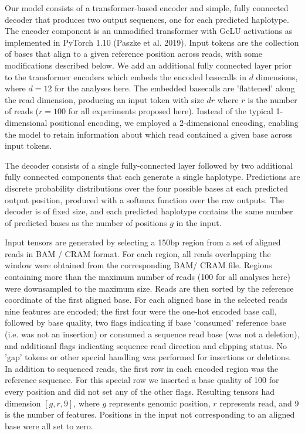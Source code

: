 \documentclass[]{article}
\begin{document}
Our model consists of a transformer-based encoder and simple, fully connected decoder that produces two output sequences, one for each predicted haplotype. The encoder component is an unmodified transformer with GeLU activations as implemented in PyTorch 1.10 (Paszke et al. 2019). Input tokens are the collection of bases that align to a given reference position across reads, with some modifications described below. We add an additional fully connected layer prior to the transformer encoders which embeds the encoded basecalls in $d$ dimensions, where $d=12$ for the analyses here. The embedded basecalls are 'flattened' along the read dimension, producing an input token with size $dr$ where $r$ is the number of reads ($r=100$ for all experiments proposed here).  Instead of the typical 1-dimensional positional encoding, we employed a 2-dimensional encoding, enabling the model to retain information about which read contained a given base across input tokens. 

The decoder consists of a single fully-connected layer followed by two additional fully connected components that each generate a single haplotype. Predictions are discrete probability distributions over the four possible bases at each predicted output position, produced with a softmax function over the raw outputs. The decoder is of fixed size, and each predicted haplotype contains the same number of predicted bases as the number of positions $g$ in the input. 

Input tensors are generated by selecting a 150bp region from a set of aligned reads in BAM / CRAM format. For each region, all reads overlapping the window were obtained from the corresponding BAM/ CRAM file. Regions containing more than the maximum number of reads (100 for all analyses here) were downsampled to the maximum size.  Reads are then sorted by the reference coordinate of the first aligned base. For each aligned base in the selected reads nine features are encoded; the first four were the one-hot encoded base call, followed by base quality, two flags indicating if base `consumed' reference base (i.e. was not an insertion) or consumed a sequence read base (was not a deletion), and additional flags indicating sequence read direction and clipping status.  No 'gap' tokens or other special handling was performed for insertions or deletions. In addition to sequenced reads, the first row in each encoded region was the reference sequence. For this special row we inserted a base quality of 100 for every position and did not set any of the other flags. Resulting tensors had dimension $[g, r, 9]$, where $g$ represents genomic position, $r$ represents read, and 9 is the number of features. Positions in the input not corresponding to an aligned base were all set to zero. 
\end{document}
